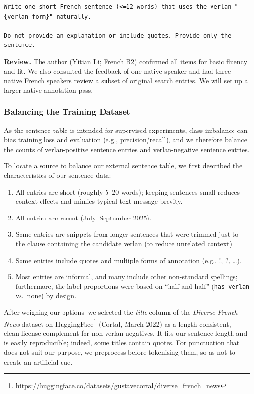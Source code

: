 \documentclass[12pt]{article}
\begin{document}
\begin{lstlisting}[breaklines=true, breakatwhitespace=false]
Write one short French sentence (<=12 words) that uses the verlan "{verlan_form}" naturally.

Do not provide an explanation or include quotes. Provide only the sentence.
\end{lstlisting}

\textbf{Review.} The author (Yitian Li; French B2) confirmed all items for basic fluency and fit. We also consulted the feedback of one native speaker and had three native French speakers review a subset of original search entries. We will set up a larger native annotation pass.

\subsubsection{Balancing the Training Dataset}

As the sentence table is intended for supervised experiments, class imbalance can bias training loss and evaluation (e.g., precision/recall), and we therefore balance the counts of verlan-positive sentence entries and verlan-negative sentence entries.

To locate a source to balance our external sentence table, we first described the characteristics of our sentence data:
\begin{enumerate}
  \item All entries are short (roughly 5--20 words); keeping sentences small reduces context effects and mimics typical text message brevity.
  \item All entries are recent (July--September 2025).
  \item Some entries are snippets from longer sentences that were trimmed just to the clause containing the candidate verlan (to reduce unrelated context).
  \item Some entries include quotes and multiple forms of annotation (e.g., !, ?, \ldots).
  \item Most entries are informal, and many include other non-standard spellings; furthermore, the label proportions were based on ``half-and-half'' (\texttt{has\_verlan} vs.\ none) by design.
\end{enumerate}

After weighing our options, we selected the \textit{title} column of the \textit{Diverse French News} dataset on HuggingFace\footnote{\url{https://huggingface.co/datasets/gustavecortal/diverse_french_news}} (Cortal, March 2022) as a length-consistent, clean-license complement for non-verlan negatives. It fits our sentence length and is easily reproducible; indeed, some titles contain quotes. For punctuation that does not suit our purpose, we preprocess before tokenising them, so as not to create an artificial cue.
\end{document}
